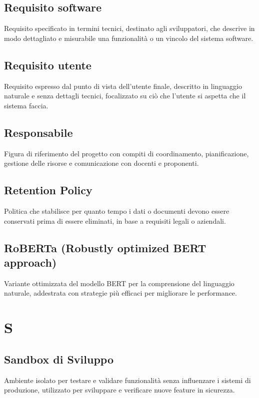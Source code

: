 \documentclass[a4paper,11pt]{article}
\begin{document}
\subsection{Requisito software}
Requisito specificato in termini tecnici, destinato agli sviluppatori, che descrive in modo dettagliato e misurabile una funzionalità o un vincolo del sistema software.

\subsection{Requisito utente}
Requisito espresso dal punto di vista dell'utente finale, descritto in linguaggio naturale e senza dettagli tecnici, focalizzato su ciò che l'utente si aspetta che il sistema faccia.

\subsection{Responsabile}
Figura di riferimento del progetto con compiti di coordinamento, pianificazione, gestione delle risorse e comunicazione con docenti e proponenti.

\subsection{Retention Policy}
Politica che stabilisce per quanto tempo i dati o documenti devono essere conservati prima di essere eliminati, in base a requisiti legali o aziendali.

\subsection{RoBERTa (Robustly optimized BERT approach)}
Variante ottimizzata del modello BERT per la comprensione del linguaggio naturale, addestrata con strategie più efficaci per migliorare le performance.

\newpage
\section{S}

\subsection{Sandbox di Sviluppo}
Ambiente isolato per testare e validare funzionalità senza influenzare i sistemi di produzione, utilizzato per sviluppare e verificare nuove feature in sicurezza.
\end{document}
